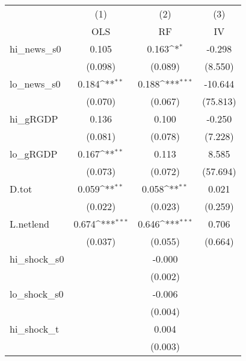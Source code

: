 {
\def\sym#1{\ifmmode^{#1}\else\(^{#1}\)\fi}
\begin{tabular}{l*{3}{c}}
\toprule
            &\multicolumn{1}{c}{(1)}&\multicolumn{1}{c}{(2)}&\multicolumn{1}{c}{(3)}\\
            &\multicolumn{1}{c}{OLS}&\multicolumn{1}{c}{RF}&\multicolumn{1}{c}{IV}\\
\midrule
hi\_news\_s0  &       0.105         &       0.163\sym{*}  &      -0.298         \\
            &     (0.098)         &     (0.089)         &     (8.550)         \\
\addlinespace
lo\_news\_s0  &       0.184\sym{**} &       0.188\sym{***}&     -10.644         \\
            &     (0.070)         &     (0.067)         &    (75.813)         \\
\addlinespace
hi\_gRGDP    &       0.136         &       0.100         &      -0.250         \\
            &     (0.081)         &     (0.078)         &     (7.228)         \\
\addlinespace
lo\_gRGDP    &       0.167\sym{**} &       0.113         &       8.585         \\
            &     (0.073)         &     (0.072)         &    (57.694)         \\
\addlinespace
D.tot       &       0.059\sym{**} &       0.058\sym{**} &       0.021         \\
            &     (0.022)         &     (0.023)         &     (0.259)         \\
\addlinespace
L.netlend   &       0.674\sym{***}&       0.646\sym{***}&       0.706         \\
            &     (0.037)         &     (0.055)         &     (0.664)         \\
\addlinespace
hi\_shock\_s0 &                     &      -0.000         &                     \\
            &                     &     (0.002)         &                     \\
\addlinespace
lo\_shock\_s0 &                     &      -0.006         &                     \\
            &                     &     (0.004)         &                     \\
\addlinespace
hi\_shock\_t  &                     &       0.004         &                     \\
            &                     &     (0.003)         &                     \\

\end{tabular}}

